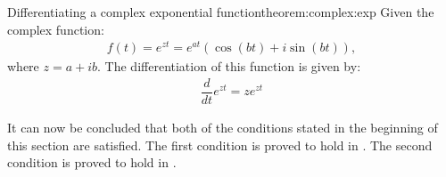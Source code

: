 \begin{theorem}{Differentiating a complex exponential function}{theorem:complex:exp}
Given the complex function:
\begin{align*}
f(t)=e^{zt}=e^{at}(\cos(bt)+i\sin(bt)),
\end{align*}
where $z=a+ib$. The differentiation of this function is given by:
\begin{align*}
\dfrac{d}{dt}e^{zt}=ze^{zt}
\end{align*}
\end{theorem}

\noindent
It can now be concluded that both of the conditions stated in the beginning of this section are satisfied. The first condition is proved to hold in . The second condition is proved to hold in .